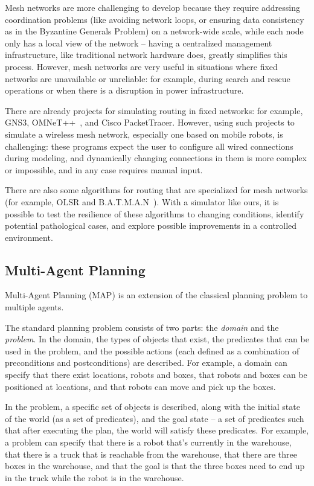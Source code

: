 \documentclass[%
]{article}
\begin{document}
Mesh networks are more challenging to develop because they require
addressing coordination problems 
(like avoiding network loops, or ensuring data consistency as in the Byzantine Generals Problem)
on a network-wide scale, while each node only has a local view of the network --
having a centralized management infrastructure, like traditional network hardware does, greatly simplifies this process.
However, mesh networks are very useful in situations where fixed networks are unavailable or unreliable:
for example, during search and rescue operations or when there is a disruption in power infrastructure.

There are already projects for simulating routing in fixed networks:
for example, GNS3, OMNeT++~\cite{9181563}, and Cisco PacketTracer.
However, using such projects to simulate a wireless mesh network,
especially one based on mobile robots, is challenging:
these programs expect the user to configure all wired connections during modeling,
and dynamically changing connections in them is more complex or impossible, and in any case requires manual input.

There are also some algorithms for routing that are specialized for mesh networks
(for example, OLSR and B.A.T.M.A.N~\cite{DBLP:journals/corr/abs-1901-02298}).
With a simulator like ours, it is possible to test the resilience of these algorithms
to changing conditions, identify potential pathological cases,
and explore possible improvements in a controlled environment.

\subsection{Multi-Agent Planning}

Multi-Agent Planning (MAP) is an extension of the classical planning problem to multiple agents.

The standard planning problem consists of two parts:
the \emph{domain} and the \emph{problem}. In the domain, the types of objects that exist,
the predicates that can be used in the problem, and the possible actions (each defined as a combination of preconditions and postconditions) are described.
For example, a domain can specify that there exist locations, robots and boxes, that robots and boxes can be positioned at locations,
and that robots can move and pick up the boxes.

In the problem, a specific set of objects is described,
along with the initial state of the world (as a set of predicates),
and the goal state -- a set of predicates such that after executing the plan,
the world will satisfy these predicates.
For example, a problem can specify that there is a robot that's currently
in the warehouse, that there is a truck that is reachable from the warehouse,
that there are three boxes in the warehouse,
and that the goal is that the three boxes need to end up in the truck while the robot is in the warehouse.
\end{document}
